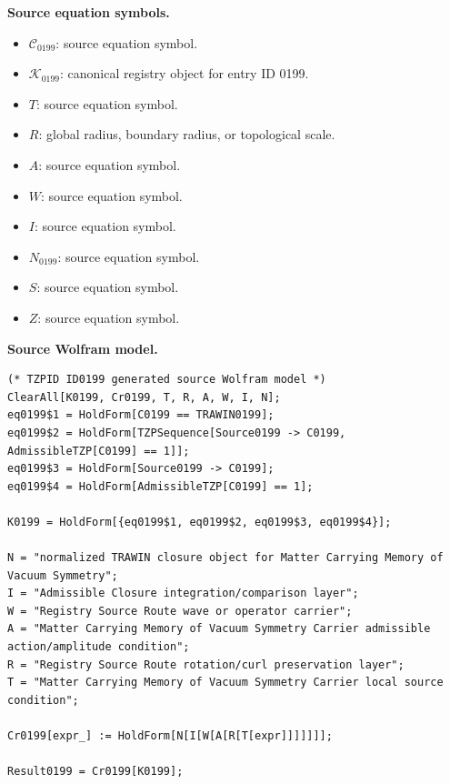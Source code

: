 \begin{minipage}[t]{0.49\linewidth}
\begingroup
\small
\raggedright
\textbf{Source equation symbols.}\par
\begin{itemize}[leftmargin=1.35em,itemsep=1pt,topsep=1pt,parsep=0pt]
    \item $\mathcal{C}_{0199}$: source equation symbol.
    \item $\mathcal{K}_{0199}$: canonical registry object for entry ID 0199.
    \item $T$: source equation symbol.
    \item $R$: global radius, boundary radius, or topological scale.
    \item $A$: source equation symbol.
    \item $W$: source equation symbol.
    \item $I$: source equation symbol.
    \item $N_{0199}$: source equation symbol.
    \item $S$: source equation symbol.
    \item $Z$: source equation symbol.
\end{itemize}
\endgroup
\end{minipage}\hfill
\begin{minipage}[t]{0.47\linewidth}
\begingroup
\scriptsize
\raggedright
\textbf{Source Wolfram model.}\par
\begin{Verbatim}[fontsize=\tiny,breaklines=true,breakanywhere=true]
(* TZPID ID0199 generated source Wolfram model *)
ClearAll[K0199, Cr0199, T, R, A, W, I, N];
eq0199$1 = HoldForm[C0199 == TRAWIN0199];
eq0199$2 = HoldForm[TZPSequence[Source0199 -> C0199, AdmissibleTZP[C0199] == 1]];
eq0199$3 = HoldForm[Source0199 -> C0199];
eq0199$4 = HoldForm[AdmissibleTZP[C0199] == 1];

K0199 = HoldForm[{eq0199$1, eq0199$2, eq0199$3, eq0199$4}];

N = "normalized TRAWIN closure object for Matter Carrying Memory of Vacuum Symmetry";
I = "Admissible Closure integration/comparison layer";
W = "Registry Source Route wave or operator carrier";
A = "Matter Carrying Memory of Vacuum Symmetry Carrier admissible action/amplitude condition";
R = "Registry Source Route rotation/curl preservation layer";
T = "Matter Carrying Memory of Vacuum Symmetry Carrier local source condition";

Cr0199[expr_] := HoldForm[N[I[W[A[R[T[expr]]]]]]];

Result0199 = Cr0199[K0199];
\end{Verbatim}
\endgroup
\end{minipage}

